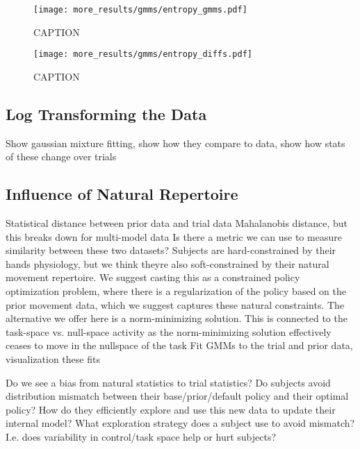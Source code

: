 \documentclass[../main.tex]{subfiles}
\begin{document}
\begin{figure}[H]
  \centering
    \texttt{[image: more\_results/gmms/entropy\_gmms.pdf]}
    \caption[Entropy of subject GMMs]{CAPTION}\label{fig:gmm_entropies}
\end{figure}

\begin{figure}[H]
  \centering
    \texttt{[image: more\_results/gmms/entropy\_diffs.pdf]}
    \caption[Successive GMM entropy differences]{CAPTION}\label{fig:gmm_entropy_diffs}
\end{figure}


\subsection{Log Transforming the Data}

Show gaussian mixture fitting, show how they compare to data, show how stats of these change over trials



\subsection{Influence of Natural Repertoire}

Statistical distance between prior data and trial data
Mahalanobis distance, but this breaks down for multi-model data
Is there a metric we can use to measure similarity between these two datasets?
Subjects are hard-constrained by their hands physiology, but we think theyre also soft-constrained by their natural movement repertoire. We suggest casting this as a constrained policy optimization problem, where there is a regularization of the policy based on the prior movement data, which we suggest captures these natural constraints. The alternative we offer here is a norm-minimizing solution.
This is connected to the task-space vs. null-space activity as the norm-minimizing solution effectively ceases to move in the nullspace of the task
Fit GMMs to the trial and prior data, visualization these fits


Do we see a bias from natural statistics to trial statistics?
Do subjects avoid distribution mismatch between their base/prior/default policy and their optimal policy? How do they efficiently explore and use this new data to update their internal model?
What exploration strategy does a subject use to avoid mismatch? I.e. does variability in control/task space help or hurt subjects?





\end{document}
